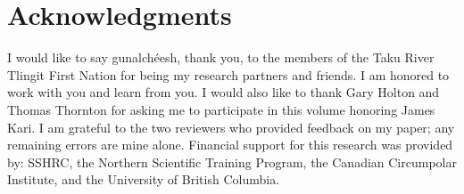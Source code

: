 \section*{Acknowledgments}

I would like to say gunalchéesh, thank you, to the members of the Taku River Tlingit First Nation for being my research partners and friends. I am honored to work with you and learn from you. I would also like to thank Gary Holton and Thomas Thornton for asking me to participate in this volume honoring James Kari. I am grateful to the two reviewers who provided feedback on my paper; any remaining errors are mine alone. Financial support for this research was provided by: SSHRC, the Northern Scientific Training Program, the Canadian Circumpolar Institute, and the University of British Columbia.


